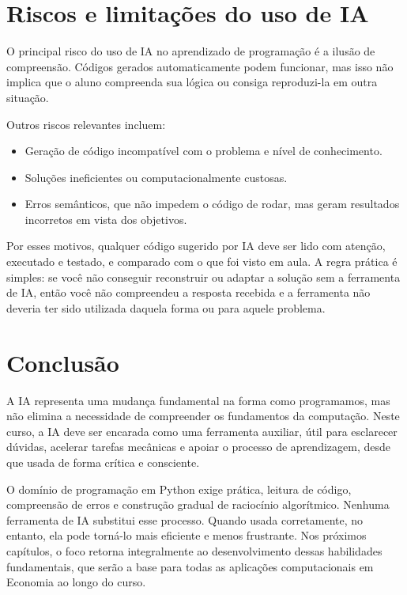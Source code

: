 \documentclass[
  brazilian,
  letterpaper,
  DIV=11,
  numbers=noendperiod]{scrreprt}
\providecommand{\tightlist}{%
  \setlength{\itemsep}{0pt}\setlength{\parskip}{0pt}}
\begin{document}
\section{Riscos e limitações do uso de
IA}\label{riscos-e-limitauxe7uxf5es-do-uso-de-ia}

O principal risco do uso de IA no aprendizado de programação é a ilusão
de compreensão. Códigos gerados automaticamente podem funcionar, mas
isso não implica que o aluno compreenda sua lógica ou consiga
reproduzi-la em outra situação.

Outros riscos relevantes incluem:

\begin{itemize}
\tightlist
\item
  Geração de código incompatível com o problema e nível de conhecimento.
\item
  Soluções ineficientes ou computacionalmente custosas.
\item
  Erros semânticos, que não impedem o código de rodar, mas geram
  resultados incorretos em vista dos objetivos.
\end{itemize}

Por esses motivos, qualquer código sugerido por IA deve ser lido com
atenção, executado e testado, e comparado com o que foi visto em aula. A
regra prática é simples: se você não conseguir reconstruir ou adaptar a
solução sem a ferramenta de IA, então você não compreendeu a resposta
recebida e a ferramenta não deveria ter sido utilizada daquela forma ou
para aquele problema.

\section{Conclusão}\label{conclusuxe3o-2}

A IA representa uma mudança fundamental na forma como programamos, mas
não elimina a necessidade de compreender os fundamentos da computação.
Neste curso, a IA deve ser encarada como uma ferramenta auxiliar, útil
para esclarecer dúvidas, acelerar tarefas mecânicas e apoiar o processo
de aprendizagem, desde que usada de forma crítica e consciente.

O domínio de programação em Python exige prática, leitura de código,
compreensão de erros e construção gradual de raciocínio algorítmico.
Nenhuma ferramenta de IA substitui esse processo. Quando usada
corretamente, no entanto, ela pode torná-lo mais eficiente e menos
frustrante. Nos próximos capítulos, o foco retorna integralmente ao
desenvolvimento dessas habilidades fundamentais, que serão a base para
todas as aplicações computacionais em Economia ao longo do curso.
\end{document}
